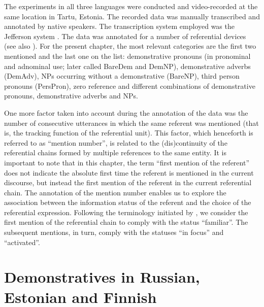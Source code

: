\documentclass[output=paper,colorlinks,citecolor=brown]{langscibook}
\begin{document}
The experiments in all three languages were conducted and video-recorded at the same location in Tartu, Estonia. The recorded data was manually transcribed and annotated by native speakers. The transcription system employed was the Jefferson system \citep{Jefferson2004}. The data was annotated for a number of referential devices (see also \citealt{ReileEtAl2019}). For the present chapter, the most relevant categories are the first two mentioned and the last one on the list: demonstrative pronouns (in pronominal and adnominal use; later called BareDem and DemNP), demonstrative adverbs (DemAdv), NPs occurring without a demonstrative (BareNP), third person pronouns (PersPron), zero reference and different combinations of demonstrative pronouns, demonstrative adverbs and NPs. 

One more factor taken into account during the annotation of the data was the number of consecutive utterances in which the same referent was mentioned (that is, the tracking function of the referential unit). This factor, which henceforth is referred to as “mention number”, is related to the (dis)continuity of the referential chains formed by multiple references to the same entity. It is important to note that in this chapter, the term “first mention of the referent” does not indicate the absolute first time the referent is mentioned in the current discourse, but instead the first mention of the referent in the current referential chain. The annotation of the mention number enables us to explore the association between the information status of the referent and the choice of the referential expression. Following the terminology initiated by \citet{GundelEtAl1993,GundelEtAl2010}, we consider the first mention of the referential chain to comply with the status “familiar”. The subsequent mentions, in turn, comply with the statuses “in focus” and “activated”.

\section{Demonstratives in Russian, Estonian and Finnish}\label{sec:nahkola:3}
\end{document}
